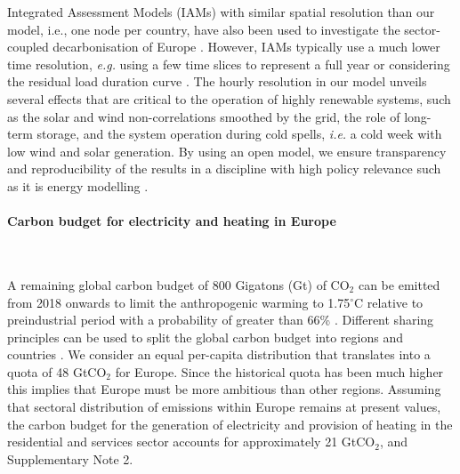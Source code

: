 \documentclass[5p]{elsarticle} %
\begin{document}
Integrated Assessment Models (IAMs) with similar spatial resolution than our model, i.e., one node per country, have also been used to investigate the sector-coupled decarbonisation of Europe \cite{in-depth_2018, JRC-EU-TIMES, Creutzig_2017}. However, IAMs typically use a much lower time resolution, \textit{e.g.} using a few time slices to represent a full year \cite{JRC-EU-TIMES, Loffler_2019, Poncelet_2016, McGlade_2015, Babrowski_2014} or considering the residual load duration curve \cite{Creutzig_2017, Ueckerdt_2017}. The hourly resolution in our model unveils several effects that are critical to the operation of highly renewable systems, such as the solar and wind non-correlations smoothed by the grid, the role of long-term storage, and the system operation during cold spells, \textsl{i.e.} a cold week with low wind and solar generation. By using an open model, we ensure transparency and reproducibility of the results in a  discipline with high policy relevance such as it is energy modelling \cite{Pfenninger_2017, Pfenninger_2018}. 

\paragraph{\textbf{Carbon budget for electricity and heating in Europe}} \

A remaining global carbon budget of 800 Gigatons (Gt) of CO$_2$ can be emitted from 2018 onwards to limit the anthropogenic warming to 1.75$^{\circ}$C relative to preindustrial period with a probability of greater than 66\% \cite{IPCC_1.5}. Different sharing principles can be used to split the global carbon budget into regions and countries \cite{Raupach_2014}. We consider an equal per-capita distribution that translates into a quota of 48 GtCO$_2$ for Europe. Since the historical quota has been much higher this implies that Europe must be more ambitious than other regions. Assuming that sectoral distribution of emissions within Europe remains at present values, the carbon budget for the generation of electricity and provision of heating in the residential and services sector accounts for approximately 21 GtCO$_2$, \cite{UNFCCC_inventory} and Supplementary Note 2. %
\end{document}
